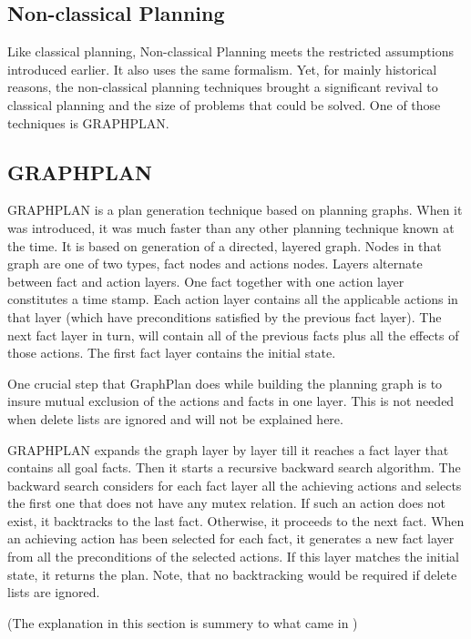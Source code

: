 \documentclass
[a4paper
,english
,parskip=half
,bibliography=totoc
]{scrreprt}
\begin{document}
        \subsection{Non-classical Planning}
        Like classical planning, Non-classical Planning meets the restricted assumptions introduced earlier. It also uses the same formalism. Yet, for mainly historical reasons, the non-classical planning techniques brought a significant revival to classical planning and the size of problems that could be solved. One of those techniques is GRAPHPLAN.  
        
        \subsection{GRAPHPLAN}
        GRAPHPLAN is a plan generation technique \citep{Blum:1997:FPT:249379.249386} based on planning graphs. When it was introduced, it was much faster than any other planning technique known at the time. It is based on generation of a directed, layered graph. Nodes in that graph are one of two types, fact nodes and actions nodes. Layers alternate between fact and action layers. One fact together with one action layer constitutes a time stamp. Each action layer contains all the applicable actions in that layer (which have preconditions satisfied by the previous fact layer). The next fact layer in turn, will contain all of the previous facts plus all the effects of those actions. The first fact layer contains the initial state.

        One crucial step that GraphPlan does while building the planning graph is to insure mutual exclusion of the actions and facts in one layer. This is not needed when delete lists are ignored and will not be explained here.

        GRAPHPLAN expands the graph layer by layer till it reaches a fact layer that contains all goal facts. Then it starts a recursive backward search algorithm. The backward search considers for each fact layer all the achieving actions and selects the first one that does not have any mutex relation. If such an action does not exist, it backtracks to the last fact. Otherwise, it proceeds to the next fact. When an achieving action has been selected for each fact, it generates a new fact layer from all the preconditions of the selected actions. If this layer matches the initial state, it returns the plan. Note, that no backtracking would be required if delete lists are ignored.
        
        (The explanation in this section is summery to what came in \citep{FF})
\end{document}
